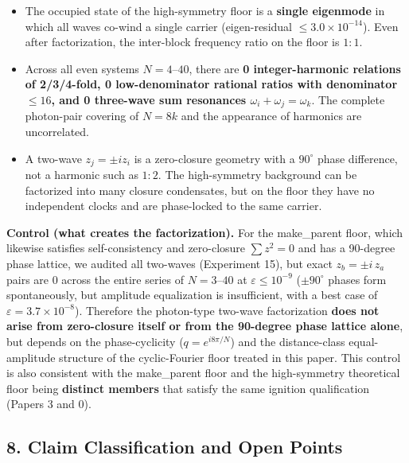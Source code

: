 \documentclass[
  a4paper,
]{ltjsarticle}
\providecommand{\tightlist}{%
  \setlength{\itemsep}{0pt}\setlength{\parskip}{0pt}}
\begin{document}
\begin{itemize}
\tightlist
\item
  The occupied state of the high-symmetry floor is a \textbf{single
  eigenmode} in which all waves co-wind a single carrier (eigen-residual
  \(\le3.0\times10^{-14}\)). Even after factorization, the inter-block
  frequency ratio on the floor is \(1{:}1\).
\item
  Across all even systems \(N=4\)--\(40\), there are \textbf{0
  integer-harmonic relations of 2/3/4-fold, 0 low-denominator rational
  ratios with denominator \(\le16\), and 0 three-wave sum resonances
  \(\omega_i+\omega_j=\omega_k\)}. The complete photon-pair covering of
  \(N=8k\) and the appearance of harmonics are uncorrelated.
\item
  A two-wave \(z_j=\pm iz_i\) is a zero-closure geometry with a
  \(90^\circ\) phase difference, not a harmonic such as \(1{:}2\). The
  high-symmetry background can be factorized into many closure
  condensates, but on the floor they have no independent clocks and are
  phase-locked to the same carrier.
\end{itemize}

\textbf{Control (what creates the factorization).} For the make\_parent
floor, which likewise satisfies self-consistency and zero-closure
\(\sum z^2=0\) and has a 90-degree phase lattice, we audited all
two-waves (Experiment 15), but exact \(z_b=\pm i\,z_a\) pairs are 0
across the entire series of \(N=3\)--\(40\) at \(\varepsilon\le10^{-9}\)
(\(\pm90^\circ\) phases form spontaneously, but amplitude equalization
is insufficient, with a best case of \(\varepsilon=3.7\times10^{-8}\)).
Therefore the photon-type two-wave factorization \textbf{does not arise
from zero-closure itself or from the 90-degree phase lattice alone}, but
depends on the phase-cyclicity (\(q=e^{i8\pi/N}\)) and the
distance-class equal-amplitude structure of the cyclic-Fourier floor
treated in this paper. This control is also consistent with the
make\_parent floor and the high-symmetry theoretical floor being
\textbf{distinct members} that satisfy the same ignition qualification
(Papers 3 and 0).

\subsection{8. Claim Classification and Open
Points}\label{claim-classification-and-open-points}
\end{document}

